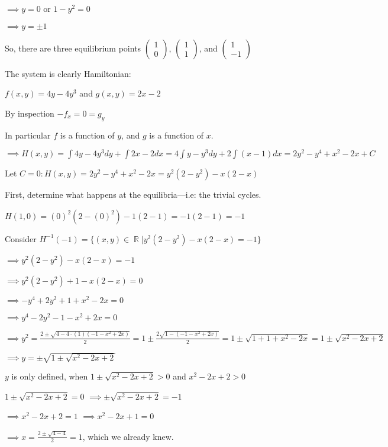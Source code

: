 \documentclass{article}
\begin{document}
$\implies y = 0$ or $1-y^2 = 0$

$\implies y = \pm 1$

So, there are three equilibrium points
$\begin{pmatrix}1\\0\end{pmatrix}$, $\begin{pmatrix}1\\
  1\end{pmatrix}$, and $\begin{pmatrix}1\\ -1\end{pmatrix}$

The system is clearly Hamiltonian:

$f(x,y) = 4y -4y^3$ and $g(x,y) = 2x-2$

By inspection $-f_x = 0 = g_y$

In particular $f$ is a function of $y$, and $g$ is a function of $x$.

$\implies H(x,y) = \int 4y -4y^3 dy + \int 2x -2 dx = 4\int y -y^3 dy
+ 2\int (x -1) dx = 2y^2 -y^4 +x^2 -2x + C$

Let $C = 0: H(x,y) = 2y^2 -y^4 +x^2 -2x = y^2(2-y^2) -x(2-x)$

First, determine what happens at the equilibria---i.e: the trivial
cycles.

$H(1, 0)= (0)^2(2-(0)^2) -1(2-1) = -1(2-1) = -1$

Consider $H^{-1}(-1) = \{(x,y)\in \BbbR| y^2(2-y^2) -x(2-x) = -1\}$

$\implies y^2(2-y^2) -x(2 -x) = -1$

$\implies y^2(2-y^2) +1 -x(2-x) = 0$

$\implies -y^4+ 2y^2 +1 +x^2 -2x = 0$

$\implies y^4 - 2y^2 -1 -x^2+ 2x = 0$

$\implies y^2 = \frac{2 \pm \sqrt{4 -4\cdot(1)(-1 -x^2+ 2x)}}{2} = 1
\pm \frac{2\sqrt{1 -(-1 -x^2+ 2x)}}{2}  = 1 \pm \sqrt{1 +1 +x^2- 2x} = 1
\pm \sqrt{x^2-2x + 2}$

$\implies y = \pm \sqrt{1
\pm \sqrt{x^2-2x+2}}$

$y$ is only defined, when $1
\pm \sqrt{x^2-2x+2} > 0$ and $x^2-2x+2 > 0$

$1 \pm \sqrt{x^2-2x+2} = 0$ $\implies \pm \sqrt{x^2-2x+2} = -1$

$\implies x^2-2x+2 = 1$ $\implies x^2-2x+1 = 0$

$\implies x = \frac{2\pm \sqrt{4-4}}{2} = 1$, which we already knew.
\end{document}
